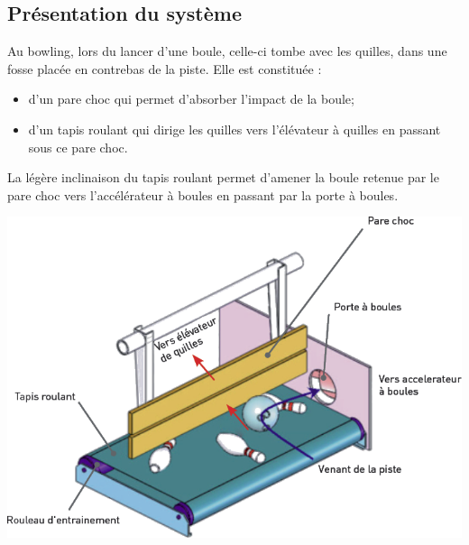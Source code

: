 \documentclass[10pt,fleqn]{article} %
\begin{document}
\def\pathfig{images}

\vspace{4.5cm}
\pagestyle{fancy}
\thispagestyle{plain}

\def\columnseprulecolor{\color{ocre}}
\setlength{\columnseprule}{0.4pt} 

\def\pathfig{images}

\ifprof
\else
\begin{multicols}{2}
\fi


\subsection*{Présentation du système}
Au bowling, lors du lancer d’une boule, celle-ci tombe avec les quilles, dans une fosse placée
en contrebas de la piste. Elle est constituée :
\begin{itemize}
\item d'un pare choc qui permet d'absorber l'impact de la boule;
\item d'un tapis roulant qui dirige les quilles vers l'élévateur à quilles en passant sous
ce pare choc.
\end{itemize}
La légère inclinaison du tapis roulant permet d'amener la boule retenue par le pare choc
vers l'accélérateur à boules en passant par la porte à boules.

\begin{center}
\includegraphics[width=\linewidth]{images/fig_01}
\end{center}




\end{multicols}
\end{document}
